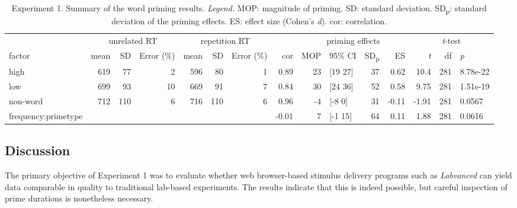 \documentclass[
]{interact}
\newcommand{\blandscape}{\begin{landscape}}
\newcommand{\elandscape}{\end{landscape}}
\begin{document}
\blandscape

\begin{longtable}{lrrrrrrrrlrrrrl}

\caption{\label{tbl-exp1-statsResults}Experiment 1. Summary of the word
priming results. \emph{Legend.} MOP: magnitude of priming. SD: standard
deviation. SD\textsubscript{p}: standard deviation of the priming
effects. ES: effect size (Cohen's \emph{d}). cor: correlation.}

\tabularnewline

\toprule
 & \multicolumn{3}{c}{unrelated RT} & \multicolumn{3}{c}{repetition RT} &  & \multicolumn{4}{c}{priming effects} & \multicolumn{3}{c}{\emph{t}-test} \\ 
\cmidrule(lr){2-4} \cmidrule(lr){5-7} \cmidrule(lr){9-12} \cmidrule(lr){13-15}
factor & mean & SD & Error (\%) & mean & SD & Error (\%) & cor & MOP & 95\% CI & SD\textsubscript{p} & ES & \emph{t} & df & \emph{p} \\ 
\midrule\addlinespace[2.5pt]
high & 619 & 77 & 2 & 596 & 80 & 1 & 0.89 & 23 & [19 27] & 37 & 0.62 & 10.4 & 281 & 8.78e-22 \\ 
low & 699 & 93 & 10 & 669 & 91 & 7 & 0.84 & 30 & [24 36] & 52 & 0.58 & 9.75 & 281 & 1.51e-19 \\ 
non-word & 712 & 110 & 6 & 716 & 110 & 6 & 0.96 & -4 & [-8 0] & 31 & -0.11 & -1.91 & 281 & 0.0567 \\ 
frequency:primetype &   &   &   &   &   &   & -0.01 & 7 & [-1 15] & 64 & 0.11 & 1.88 & 281 & 0.0616 \\ 
\bottomrule

\end{longtable}

\elandscape

\subsection{Discussion}\label{sec-exp1-discussion}

The primary objective of Experiment 1 was to evaluate whether web
browser-based stimulus delivery programs such as \emph{Labvanced} can
yield data comparable in quality to traditional lab-based experiments.
The results indicate that this is indeed possible, but careful
inspection of prime durations is nonetheless necessary.
\end{document}
